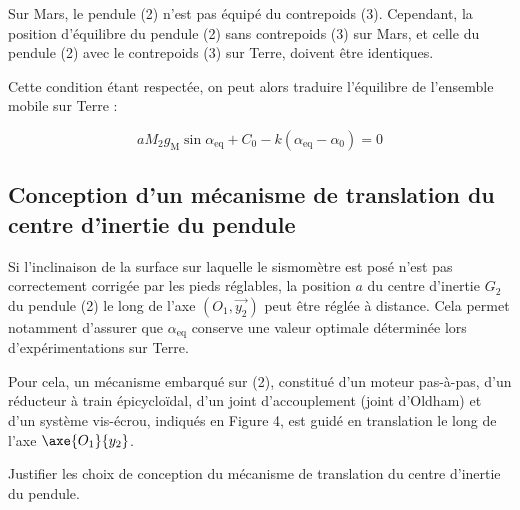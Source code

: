 Sur Mars, le pendule (2) n'est pas équipé du contrepoids (3). Cependant, la position d'équilibre du pendule (2) sans contrepoids (3) sur Mars, et celle du pendule (2) avec le contrepoids (3) sur Terre, doivent être identiques.


Cette condition étant respectée, on peut alors traduire l'équilibre de l'ensemble mobile sur Terre :


$$
a M_{2} g_{\mathrm{M}} \sin \alpha_{\mathrm{eq}}+C_{0}-k\left(\alpha_{\mathrm{eq}}-\alpha_{0}\right)=0 %
$$


\subsection{Conception d'un mécanisme de translation du centre d'inertie du pendule}
Si l'inclinaison de la surface sur laquelle le sismomètre est posé n'est pas correctement corrigée par les pieds réglables, la position $a$ du centre d'inertie $G_{2}$ du pendule (2) le long de l'axe $\left(O_{1}, \overrightarrow{y_{2}}\right)$ peut être réglée à distance. Cela permet notamment d'assurer que $\alpha_{\mathrm{eq}}$ conserve une valeur optimale déterminée lors d'expérimentations sur Terre.

Pour cela, un mécanisme embarqué sur (2), constitué d'un moteur pas-à-pas, d'un réducteur à train épicycloïdal, d'un joint d'accouplement (joint d'Oldham) et d'un système vis-écrou, indiqués en Figure 4, est guidé en translation le long de l'axe  $\axe{O_1}{y_2}$.

\begin{obj}
Justifier les choix de conception du mécanisme de translation du centre d'inertie du pendule.
\end{obj}



